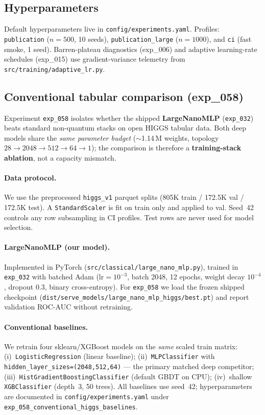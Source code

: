 \subsection{Hyperparameters}

Default hyperparameters live in \texttt{config/experiments.yaml}.
Profiles: \texttt{publication} ($n{=}500$, 10 seeds), \texttt{publication\_large} ($n{=}1000$),
and \texttt{ci} (fast smoke, 1 seed).
Barren-plateau diagnostics (exp\_006) and adaptive learning-rate schedules (exp\_015)
use gradient-variance telemetry from \texttt{src/training/adaptive\_lr.py}.

\subsection{Conventional tabular comparison (exp\_058)}

Experiment \texttt{exp\_058} isolates whether the shipped \textbf{LargeNanoMLP}
(\texttt{exp\_032}) beats standard non-quantum stacks on open HIGGS tabular data.
Both deep models share the \emph{same parameter budget} ($\sim$1.14\,M weights,
topology $28{\rightarrow}2048{\rightarrow}512{\rightarrow}64{\rightarrow}1$); the
comparison is therefore a \textbf{training-stack ablation}, not a capacity mismatch.

\paragraph{Data protocol.}
We use the preprocessed \texttt{higgs\_v1} parquet splits (805K train / 172.5K val /
172.5K test). A \texttt{StandardScaler} is fit on train only and applied to val.
Seed~42 controls any row subsampling in CI profiles. Test rows are never used for
model selection.

\paragraph{LargeNanoMLP (our model).}
Implemented in PyTorch (\texttt{src/classical/large\_nano\_mlp.py}), trained in
\texttt{exp\_032} with batched Adam ($\mathrm{lr}{=}10^{-3}$, batch 2048, 12 epochs,
weight decay $10^{-4}$, dropout 0.3, binary cross-entropy). For \texttt{exp\_058} we
load the frozen shipped checkpoint (\texttt{dist/serve\_models/large\_nano\_mlp\_higgs/best.pt})
and report validation ROC-AUC without retraining.

\paragraph{Conventional baselines.}
We retrain four sklearn/XGBoost models on the \emph{same} scaled train matrix:
(i)~\texttt{LogisticRegression} (linear baseline);
(ii)~\texttt{MLPClassifier} with \texttt{hidden\_layer\_sizes=(2048,512,64)} --- the
primary matched deep competitor;
(iii)~\texttt{HistGradientBoostingClassifier} (default GBDT on CPU);
(iv)~shallow \texttt{XGBClassifier} (depth~3, 50 trees).
All baselines use seed~42; hyperparameters are documented in
\texttt{config/experiments.yaml} under \texttt{exp\_058\_conventional\_higgs\_baselines}.

